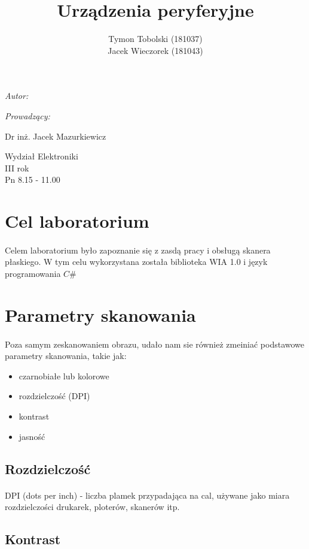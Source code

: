 \documentclass[wide,a4paper,titlepage,12pt] {article}
\title{Urządzenia peryferyjne}
\author{Tymon Tobolski (181037)\\ Jacek Wieczorek (181043)}
\makeatletter
\renewcommand{\maketitle}{
\begin{titlepage}
  \begin{center}
    \vspace*{3cm}
    \LARGE \@title \par
    \vspace{2cm}
    \textit{\small Autor:}\par
    \normalsize \@author\par \normalsize
    \vspace{3cm}
    \textit{\small Prowadzący:}\par
    Dr inż. Jacek Mazurkiewicz \par
    \vspace{2cm}
    Wydział Elektroniki\\ III rok\\ Pn 8.15 - 11.00\par
    \vspace{4cm}
    \small \@date
  \end{center}
\end{titlepage}
}
\makeatother
\begin{document}
\maketitle

\section{Cel laboratorium}
\paragraph{}
Celem laboratorium było zapoznanie się z zasdą pracy i obsługą skanera płaskiego. W tym celu wykorzystana została biblioteka WIA 1.0 i język programowania $C\#$

\section{Parametry skanowania}
\paragraph{} %
Poza samym zeskanowaniem obrazu, udało nam sie również zmeiniać podstawowe parametry skanowania, takie jak:
\begin{itemize}
    \item czarnobiałe lub kolorowe
    \item rozdzielczość (DPI)
    \item kontrast
    \item jasność
\end{itemize}

\subsection{Rozdzielczość}
\paragraph{}
DPI (dots per inch) - liczba plamek przypadająca na cal, używane jako miara rozdzielczości drukarek, ploterów, skanerów itp. 

\paragraph{} %
\label{par:}

\subsection{Kontrast}
\end{document}

